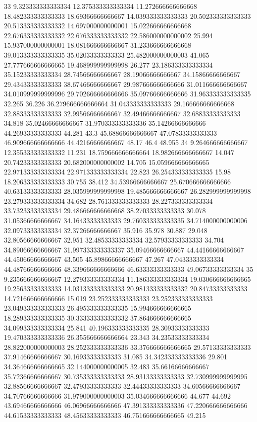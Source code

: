 33 9.323333333333334 12.375333333333334 11.272666666666668 18.482333333333333 18.69366666666667 14.039333333333333 20.502333333333333 20.513333333333332 14.697000000000001 15.022666666666668 22.676333333333332 22.676333333333332 22.586000000000002 25.994 15.937000000000001 18.081666666666667 31.233666666666668 39.013333333333335 35.02033333333333 25.482000000000003 41.065 27.777666666666665 19.468999999999998 26.277 23.186333333333334 35.15233333333334 28.74566666666667 28.19066666666667 34.15866666666667 29.43433333333333 38.67466666666667 29.987666666666666 31.011666666666667 34.010999999999996 29.702666666666666 35.09766666666666 31.963333333333335 32.265 36.226 36.279666666666664 31.043333333333333 29.166666666666668 32.88333333333333 32.99566666666667 32.49466666666667 32.68833333333333 34.818 35.02466666666667 31.970333333333336 35.14266666666666 44.26933333333333 44.281 43.3 45.68866666666667 47.07833333333333 46.909666666666666 44.42166666666667 48.17 46.4 48.955
34 9.264666666666667 12.355333333333332 11.231 18.759666666666664 18.982666666666667 14.047 20.74233333333333 20.682000000000002 14.705 15.059666666666665 22.971333333333334 22.971333333333334 22.823 26.254333333333335 15.98 18.206333333333333 30.755 38.412 34.53966666666667 25.670666666666666 40.63133333333333 28.035999999999998 19.485666666666667 26.282999999999998 23.279333333333334 34.682 28.761333333333333 28.227333333333334 33.73233333333334 29.486666666666668 38.27033333333333 30.078 31.05366666666667 34.16433333333333 29.760333333333335 34.714000000000006 32.09733333333334 32.37266666666667 35.916 35.978 30.887 29.048 32.80566666666667 32.951 32.48533333333334 32.57933333333333 34.704 34.89066666666667 31.997333333333337 35.09466666666667 44.44166666666667 44.45066666666667 43.505 45.89866666666667 47.267 47.04333333333334 44.48766666666666 48.339666666666666 46.63333333333333 49.06733333333334
35 9.235666666666667 12.279333333333334 11.186333333333334 19.030666666666665 19.25633333333333 14.031333333333333 20.981333333333332 20.84733333333333 14.721666666666666 15.019 23.252333333333333 23.252333333333333 23.049333333333333 26.495333333333335 15.994666666666665 18.289333333333335 30.333333333333332 37.864666666666665 34.099333333333334 25.841 40.196333333333335 28.30933333333333 19.470333333333336 26.355666666666664 23.343 34.23533333333334 28.822000000000003 28.252333333333336 33.376666666666665 29.57133333333333 37.91466666666667 30.16933333333333 31.085 34.342333333333336 29.801 34.364666666666665 32.144000000000005 32.483 35.66166666666667 35.72366666666667 30.735333333333333 28.93133333333333 32.730999999999995 32.88566666666667 32.47933333333333 32.44433333333333 34.60566666666667 34.70766666666666 31.979000000000003 35.034666666666666 44.677 44.692 43.69466666666666 46.06966666666666 47.391333333333336 47.220666666666666 44.61533333333333 48.45633333333333 46.751666666666665 49.215
